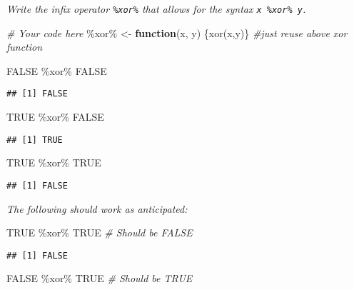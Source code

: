 \documentclass[
]{article}
\newenvironment{Shaded}{\begin{snugshade}}{\end{snugshade}}
\newcommand{\AttributeTok}[1]{\textcolor[rgb]{0.77,0.63,0.00}{#1}}
\newcommand{\CommentTok}[1]{\textcolor[rgb]{0.56,0.35,0.01}{\textit{#1}}}
\newcommand{\ConstantTok}[1]{\textcolor[rgb]{0.00,0.00,0.00}{#1}}
\newcommand{\ControlFlowTok}[1]{\textcolor[rgb]{0.13,0.29,0.53}{\textbf{#1}}}
\newcommand{\FunctionTok}[1]{\textcolor[rgb]{0.00,0.00,0.00}{#1}}
\newcommand{\NormalTok}[1]{#1}
\newcommand{\OtherTok}[1]{\textcolor[rgb]{0.56,0.35,0.01}{#1}}
\newcommand{\SpecialCharTok}[1]{\textcolor[rgb]{0.00,0.00,0.00}{#1}}
\newcommand{\StringTok}[1]{\textcolor[rgb]{0.31,0.60,0.02}{#1}}
\begin{document}
\emph{Write the infix operator \texttt{\%xor\%} that allows for the
syntax \texttt{x\ \%xor\%\ y}.}

\begin{Shaded}
\begin{Highlighting}[]
\CommentTok{\# Your code here}
\StringTok{\textasciigrave{}}\AttributeTok{\%xor\%}\StringTok{\textasciigrave{}} \OtherTok{\textless{}{-}} \ControlFlowTok{function}\NormalTok{(x, y) \{}\FunctionTok{xor}\NormalTok{(x,y)\} }\CommentTok{\#just reuse above xor function}

\ConstantTok{FALSE} \SpecialCharTok{\%xor\%} \ConstantTok{FALSE}
\end{Highlighting}
\end{Shaded}

\begin{verbatim}
## [1] FALSE
\end{verbatim}

\begin{Shaded}
\begin{Highlighting}[]
\ConstantTok{TRUE} \SpecialCharTok{\%xor\%} \ConstantTok{FALSE}
\end{Highlighting}
\end{Shaded}

\begin{verbatim}
## [1] TRUE
\end{verbatim}

\begin{Shaded}
\begin{Highlighting}[]
\ConstantTok{TRUE} \SpecialCharTok{\%xor\%} \ConstantTok{TRUE}
\end{Highlighting}
\end{Shaded}

\begin{verbatim}
## [1] FALSE
\end{verbatim}

\emph{The following should work as anticipated:}

\begin{Shaded}
\begin{Highlighting}[]
\ConstantTok{TRUE} \SpecialCharTok{\%xor\%} \ConstantTok{TRUE}  \CommentTok{\# Should be FALSE}
\end{Highlighting}
\end{Shaded}

\begin{verbatim}
## [1] FALSE
\end{verbatim}

\begin{Shaded}
\begin{Highlighting}[]
\ConstantTok{FALSE} \SpecialCharTok{\%xor\%} \ConstantTok{TRUE}  \CommentTok{\# Should be TRUE}
\end{Highlighting}
\end{Shaded}
\end{document}

